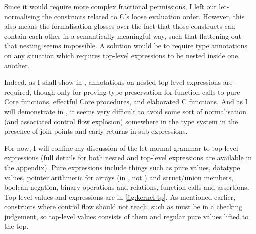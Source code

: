 Since it would require more complex fractional permissions, I left out
let-normalising the constructs related to C's loose evaluation order. However, this also means the formalisation glosses %
over the fact that those constructs can contain each other in a semantically
meaningful way, such that flattening out that nesting seems impossible. A
solution would be to require type annotations on any situation which requires
top-level expressions to be nested inside one another.

Indeed, as I shall show in , annotations on
nested top-level expressions are required, though only for proving type
preservation for function calls to pure Core functions, effectful Core
procedures, and elaborated C functions. And as I will demonstrate in
, it seems very difficult to avoid some sort
of normalisation (and associated control flow explosion) somewhere in the type
system in the presence of join-points and early returns in sub-expressions.

For now, I will confine my discussion of the let-normal grammar to top-level
expressions (full details for both nested and top-level expressions are
available in the appendix). Pure expressions include things such as pure values,
datatype values, pointer arithmetic for arrays (in , not )
and struct/union members, boolean negation, binary operations and relations, function
calls and assertions. Top-level values and expressions are in
\cref{fig:kernel-tp}. As mentioned earlier, constructs where control flow
should not reach, such as  must be in a checking %
judgement, so top-level values consists of them and regular pure values lifted
to the top.

